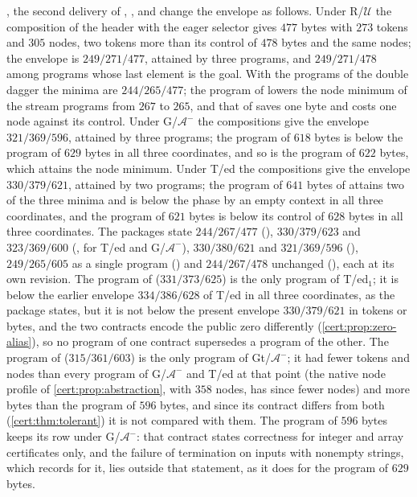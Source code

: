 , the second delivery of ,
,  and  change the envelope
as follows. Under R/$\mathcal U$ the composition of the header with the eager
selector gives $477$ bytes with $273$ tokens and $305$ nodes, two tokens more
than its control of $478$ bytes and the same nodes; the envelope is
$249/271/477$, attained by three programs, and $249/271/478$ among programs
whose last element is the goal. With the programs of the double dagger the
minima are $244/265/477$; the program of  lowers the node
minimum of the stream programs from $267$ to $265$, and that of 
saves one byte and costs one node against its control. Under
G/$\mathcal A^{-}$ the compositions give the envelope $321/369/596$, attained
by three programs; the program of $618$ bytes is below the program of $629$
bytes in all three coordinates, and so is the program of $622$ bytes, which
attains the node minimum. Under T/ed the compositions give the envelope
$330/379/621$, attained by two programs; the program of $641$ bytes of
 attains two of the three minima and is below the
phase by an empty context in all three coordinates, and the program of $621$
bytes is below its control of $628$ bytes in all three coordinates. The
packages state $244/267/477$ (), $330/379/623$ and
$323/369/600$ (, for T/ed and G/$\mathcal A^{-}$),
$330/380/621$ and $321/369/596$ (), $249/265/605$ as a single
program () and $244/267/478$ unchanged (),
each at its own revision. The program of  ($331/373/625$) is
the only program of T/ed$_1$; it is below the earlier envelope $334/386/628$ of
T/ed in all three coordinates, as the package states, but it is not below the
present envelope $330/379/621$ in tokens or bytes, and the two contracts encode
the public zero differently (\cref{cert:prop:zero-alias}), so no program of
one contract supersedes a program of the other. The program of
 ($315/361/603$) is the only program of
Gt/$\mathcal A^{-}$; it had fewer tokens and nodes than every program of
G/$\mathcal A^{-}$ and T/ed at that point (the native node profile of
\cref{cert:prop:abstraction}, with $358$ nodes, has since fewer nodes) and
more bytes than the program of $596$ bytes, and
since its contract differs from both (\cref{cert:thm:tolerant}) it is not
compared with them. The program of $596$ bytes keeps its row under
G/$\mathcal A^{-}$: that contract states correctness for integer and array
certificates only, and the failure of termination on inputs with nonempty
strings, which  records for it, lies outside that
statement, as it does for the program of $629$ bytes.

